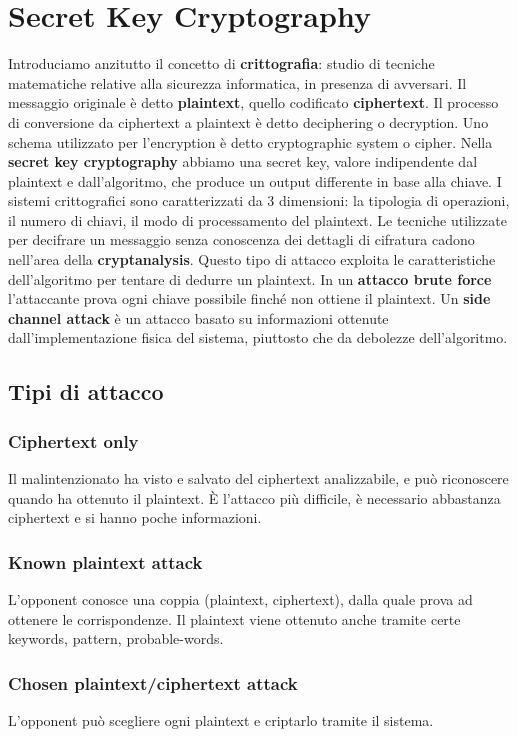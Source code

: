 \documentclass[11pt]{article}
\begin{document}
\section{Secret Key Cryptography}
Introduciamo anzitutto il concetto di \textbf{crittografia}: studio di tecniche matematiche relative alla sicurezza informatica, in presenza di avversari. Il messaggio originale è detto \textbf{plaintext}, quello codificato \textbf{ciphertext}. Il processo di conversione da ciphertext a plaintext è detto deciphering o decryption. Uno schema utilizzato per l'encryption è detto cryptographic system o cipher.
Nella \textbf{secret key cryptography} abbiamo una secret key, valore indipendente dal plaintext e dall'algoritmo, che produce un output differente in base alla chiave.
I sistemi crittografici sono caratterizzati da 3 dimensioni: la tipologia di operazioni, il numero di chiavi, il modo di processamento del plaintext.
Le tecniche utilizzate per decifrare un messaggio senza conoscenza dei dettagli di cifratura cadono nell'area della \textbf{cryptanalysis}. Questo tipo di attacco exploita le caratteristiche dell'algoritmo per tentare di dedurre un plaintext. In un \textbf{attacco brute force} l'attaccante prova ogni chiave possibile finché non ottiene il plaintext. Un \textbf{side channel attack} è un attacco basato su informazioni ottenute dall'implementazione fisica del sistema, piuttosto che da debolezze dell'algoritmo. 
\subsection{Tipi di attacco}
\subsubsection{Ciphertext only}
Il malintenzionato ha visto e salvato del ciphertext analizzabile, e può riconoscere quando ha ottenuto il plaintext. È l'attacco più difficile, è necessario abbastanza ciphertext e si hanno poche informazioni.
\subsubsection{Known plaintext attack}
L'opponent conosce una coppia (plaintext, ciphertext), dalla quale prova ad ottenere le corrispondenze. Il plaintext viene ottenuto anche tramite certe keywords, pattern, probable-words. 
\subsubsection{Chosen plaintext/ciphertext attack}
L'opponent può scegliere ogni plaintext e criptarlo tramite il sistema.
\end{document}
